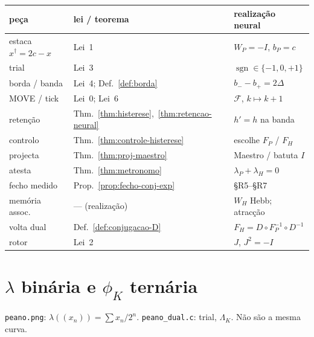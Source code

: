 \documentclass[11pt,a4paper]{article}
\newcommand{\code}[1]{\texttt{#1}}
\begin{document}
\begin{center}\small
\begin{tabular}{@{}lll@{}}
\toprule
peça & lei / teorema & realização neural \\
\midrule
estaca $x^{\dagger}=2c-x$ & Lei~1 & $W_P=-I$, $b_P=c$ \\
trial & Lei~3 & $\operatorname{sgn}\in\{-1,0,+1\}$ \\
borda / banda & Lei~4; Def.~\ref{def:borda} & $b_{-}-b_{+}=2\Delta$ \\
MOVE / tick & Lei~0; Lei~6 & $\mathcal{F}$, $k\mapsto k+1$ \\
retenção & Thm.~\ref{thm:histerese},~\ref{thm:retencao-neural} & $h'=h$ na banda \\
controlo & Thm.~\ref{thm:controle-histerese} & escolhe $F_P$ / $F_H$ \\
projecta & Thm.~\ref{thm:proj-maestro} & Maestro / batuta $I$ \\
atesta & Thm.~\ref{thm:metronomo} & $\lambda_P+\lambda_H=0$ \\
fecho medido & Prop.~\ref{prop:fecho-conj-exp} & §R5--§R7 \\
memória assoc. & --- (realização) & $W_H$ Hebb; atracção \\
volta dual & Def.~\ref{def:conjugacao-D} & $F_H=D\circ F_P^{-1}\circ D^{-1}$ \\
rotor & Lei~2 & $J$, $J^{2}=-I$ \\
\bottomrule
\end{tabular}
\end{center}


\section{$\lambda$ binária e $\phi_K$ ternária}

\code{peano.png}: $\lambda((x_n))=\sum x_n/2^n$.
\code{peano\_dual.c}: trial, $\Lambda_K$. Não são a mesma curva.
\end{document}
